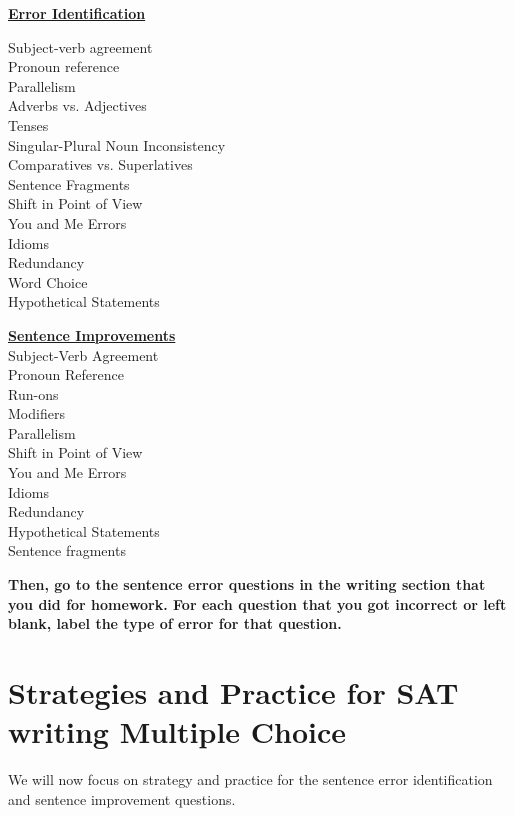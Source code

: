 \documentclass[12pt]{book}
\begin{document}
\bigskip
\begin{center}
\begin{multicols}{2}
\textbf{\underline{Error Identification}}

Subject-verb agreement\\
Pronoun reference\\
Parallelism\\
Adverbs vs. Adjectives\\
Tenses\\
Singular-Plural Noun Inconsistency\\
Comparatives vs. Superlatives\\
Sentence Fragments\\
Shift in Point of View\\
You and Me Errors\\
Idioms\\
Redundancy\\
Word Choice\\
Hypothetical Statements

\columnbreak
\textbf{\underline{Sentence Improvements}}\\
Subject-Verb Agreement\\
Pronoun Reference\\
Run-ons\\
Modifiers\\
Parallelism\\
Shift in Point of View\\
You and Me Errors\\
Idioms\\
Redundancy\\
Hypothetical Statements\\
Sentence fragments\\
\end{multicols}
\end{center}

\bigskip
\textbf{Then, go to the sentence error questions in the writing section that you did for homework. For each question that you got incorrect or left blank, label the type of error for that question.}

\vfill
\newpage

\section[Multiple Choice Strategies]{Strategies and Practice for SAT writing Multiple Choice}

We will now focus on strategy and practice for the sentence error identification and sentence improvement questions. 
\end{document}
